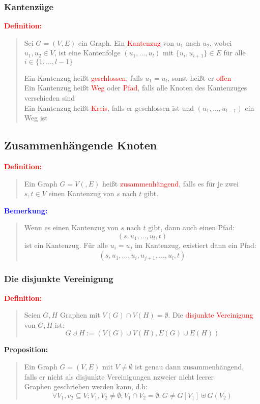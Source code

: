 \documentclass{article}
\newcommand{\red}[1]{\textcolor{red}{#1}}
\newcommand{\blue}[1]{\textcolor{blue}{#1}}
\newcommand{\dgr}[1]{\textcolor{dgr}{#1}}
\newcommand{\de}[1]{\red{\textbf{Definition: }}\begin{quote}#1\end{quote}}
\newcommand{\an}[1]{\blue{\textbf{Bemerkung: }}\begin{quote}#1\end{quote}}
\newcommand{\prop}[1]{\dgr{\textbf{Proposition: }}\begin{quote}#1\end{quote}}
\begin{document}
\subsubsection{Kantenzüge}

\de{
    Sei $G=(V,E)$ ein Graph. Ein \red{Kantenzug} von $u_1$ nach $u_2$, wobei $u_1,u_2 \in V$, ist eine Kantenfolge $(u_1, \dots, u_l)$ mit $\{u_i, u_{i+1}\} \in E$ für alle $i \in \{1, \dots, l-1\}$

    Ein Kantenzug heißt \red{geschlossen}, falls $u_1 = u_l$, sonst heißt er \red{offen}\\
    Ein Kantenzug heißt \red{Weg} oder \red{Pfad}, falls alle Knoten des Kantenzuges verschieden sind\\
    Ein Kantenzug heißt \red{Kreis}, falls er geschlossen ist und $(u_1, \dots, u_{l-1})$ ein Weg ist
}

\subsection{Zusammenhängende Knoten}

\de{
    Ein Graph $G=V(,E)$ heißt \red{zusammenhängend}, falls es für je zwei $s,t \in V$ einen Kantenzug von $s$ nach $t$ gibt.
}

\an{
    Wenn es einen Kantenzug von $s$ nach $t$ gibt, dann auch einen Pfad:
    $$(s,u_1,\dots,u_l,t)$$
    ist ein Kantenzug. Für alle $u_i = u_j$ im Kantenzug, existiert dann ein Pfad:
    $$(s, u_1,\dots,u_i,u_{j+1},\dots,u_l,t)$$
}

\subsubsection{Die disjunkte Vereinigung}
\de{
    Seien $G,H$ Graphen mit $V(G) \cap V(H) = \emptyset$. Die \red{disjunkte Vereinigung} von $G,H$ ist:
    $$G \uplus H := (V(G) \cup V(H), E(G) \cup E(H))$$
}

\prop{
    Ein Graph $G=(V,E)$ mit $V \ne \emptyset$ ist genau dann zusammenhängend,\\
    falls er nicht als disjunkte Vereinigungen nzweier nicht leerer\\
     Graphen geschrieben werden kann, d.h:
    $$
        \forall V_1, v_2 \subseteq V; V_1,V_2 \ne \emptyset; V_1 \cap V_2 = \emptyset: G \ne G[V_1] \uplus G(V_2)
    $$
}
\end{document}
